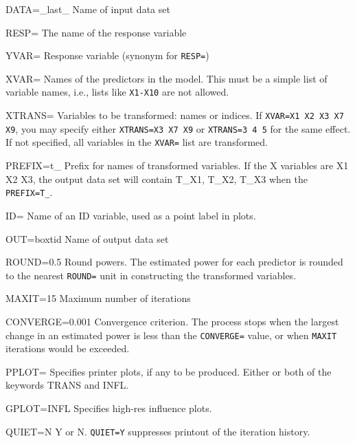 \begin{proglist}

\item[DATA=\_last\_] Name of input data set

\item[RESP=] The name of the response variable

\item[YVAR=] Response variable (synonym for \texttt{RESP=})

\item[XVAR=] Names of the predictors in the model.  This must
be a simple list of variable names, i.e., lists
like \texttt{X1-X10} are not allowed.

\item[XTRANS=] Variables to be transformed: names or indices.
If \texttt{XVAR=X1 X2 X3 X7 X9}, you may specify either
\texttt{XTRANS=X3 X7 X9} or \texttt{XTRANS=3 4 5} for the same effect.
If not specified, all variables in the \texttt{XVAR=} list
are transformed.

\item[PREFIX=t\_] Prefix for names of transformed variables.  If the
X variables are X1 X2 X3, the output data set will
contain T\_X1, T\_X2, T\_X3 when the \texttt{PREFIX=T\_}.

\item[ID=] Name of an ID variable, used as a point label in plots.

\item[OUT=boxtid] Name of output data set

\item[ROUND=0.5] Round powers.  The estimated power for each predictor
is rounded to the nearest \texttt{ROUND=} unit in constructing
the transformed variables.

\item[MAXIT=15] Maximum number of iterations

\item[CONVERGE=0.001] Convergence criterion.  The process stops when the
largest change in an estimated power is less than
the \texttt{CONVERGE=} value, or when \texttt{MAXIT} iterations would
be exceeded.

\item[PPLOT=] Specifies printer plots, if any to be produced.
Either or both of the keywords TRANS and INFL.

\item[GPLOT=INFL] Specifies high-res influence plots.

\item[QUIET=N] Y or N.  \texttt{QUIET=Y} suppresses printout of the iteration
history.

\end{proglist}
